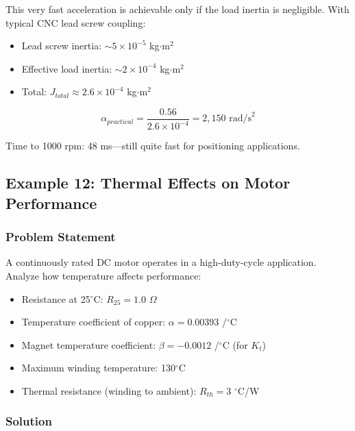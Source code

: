 This very fast acceleration is achievable only if the load inertia is negligible. With typical CNC lead screw coupling:
\begin{itemize}
    \item Lead screw inertia: $\sim 5 \times 10^{-5}$ kg$\cdot$m$^2$
    \item Effective load inertia: $\sim 2 \times 10^{-4}$ kg$\cdot$m$^2$
    \item Total: $J_{total} \approx 2.6 \times 10^{-4}$ kg$\cdot$m$^2$
\end{itemize}

\begin{equation}
    \alpha_{practical} = \frac{0.56}{2.6 \times 10^{-4}} = 2,150 \text{ rad/s}^2
\end{equation}

Time to 1000 rpm: 48 ms---still quite fast for positioning applications.

\subsection{Example 12: Thermal Effects on Motor Performance}

\subsubsection{Problem Statement}

A continuously rated DC motor operates in a high-duty-cycle application. Analyze how temperature affects performance:
\begin{itemize}
    \item Resistance at 25$^\circ$C: $R_{25} = 1.0$ $\Omega$
    \item Temperature coefficient of copper: $\alpha = 0.00393$ /$^\circ$C
    \item Magnet temperature coefficient: $\beta = -0.0012$ /$^\circ$C (for $K_t$)
    \item Maximum winding temperature: 130$^\circ$C
    \item Thermal resistance (winding to ambient): $R_{th} = 3$ $^\circ$C/W
\end{itemize}

\subsubsection{Solution}

